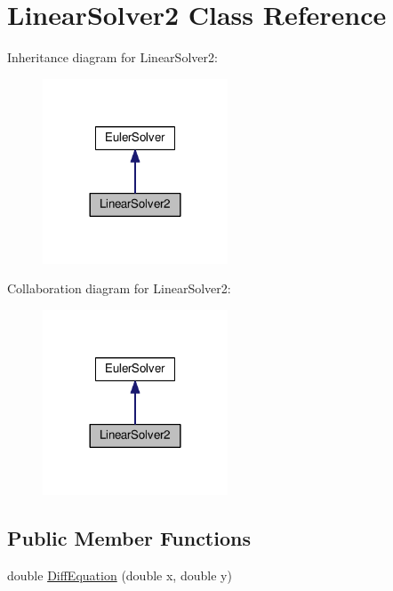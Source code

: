 \hypertarget{classLinearSolver2}{}\section{Linear\+Solver2 Class Reference}
\label{classLinearSolver2}


Inheritance diagram for Linear\+Solver2\+:\nopagebreak
\begin{figure}[H]
\begin{center}
\leavevmode
\includegraphics[width=156pt]{classLinearSolver2__inherit__graph}
\end{center}
\end{figure}


Collaboration diagram for Linear\+Solver2\+:\nopagebreak
\begin{figure}[H]
\begin{center}
\leavevmode
\includegraphics[width=156pt]{classLinearSolver2__coll__graph}
\end{center}
\end{figure}
\subsection*{Public Member Functions}
\begin{DoxyCompactItemize}
\item 
double \hyperlink{classLinearSolver2_a23f2411fabb79e2d617cb4f89472be42}{Diff\+Equation} (double x, double y)
\end{DoxyCompactItemize}
